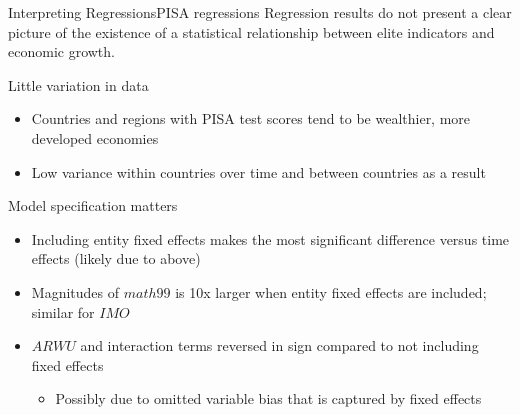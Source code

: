 \documentclass[10pt]{beamer}
\begin{document}
\begin{frame}{Interpreting Regressions}{PISA regressions}
    Regression results do not present a clear picture of the existence of a statistical relationship between elite indicators and economic growth.
    \begin{block}{Little variation in data}
        \begin{itemize}
            \item Countries and regions with PISA test scores tend to be wealthier, more developed economies
            \item Low variance within countries over time and between countries as a result
        \end{itemize}
    \end{block}

    \begin{block}{Model specification matters}
        \begin{itemize}
            \item Including entity fixed effects makes the most significant difference versus time effects (likely due to above)
            \item Magnitudes of $math99$ is 10x larger when entity fixed effects are included; similar for $IMO$
            \item $ARWU$ and interaction terms reversed in sign compared to not including fixed effects
            \begin{itemize}
                \item Possibly due to omitted variable bias that is captured by fixed effects
            \end{itemize}
        \end{itemize}

    \end{block}
    
\end{frame}
\end{document}
